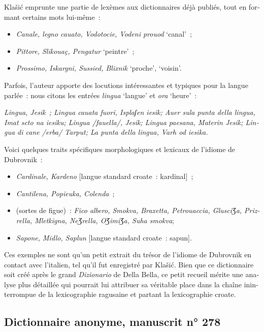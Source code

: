 \documentclass[output=paper,colorlinks,citecolor=brown,arabicfont,chinesefont,booklanguage=french]{langscibook}
\begin{document}
\begin{otherlanguage}{french}
Klašić emprunte une partie de lexèmes aux dictionnaires déjà publiés, tout en formant certains mots lui-même~:

\begin{itemize}
    \item \emph{Canale, legno cauato, Vodotocie, Vodeni prouod} ‘canal’~;
    \item \emph{Pittore, Slikouaç, Pengatur} ‘peintre’~; 
    \item \emph{Prossimo, Iskargni, Sussied, Blixnik} ‘proche’, ‘voisin’. 
\end{itemize}

Parfois, l’auteur apporte des locutions intéressantes et typiques pour la langue parlée~: nous citons les entrées \emph{lingua} ‘langue’ et \emph{ora} ‘heure’~: 

\emph{Lingua, Jesik~; Lingua cauata fuori, Isplaʃen iesik; Auer sula punta della lingua, Imat scto na iesiku; Lingua /fauella/, Jesik; Lingua paesana, Materin Jesik; Lingua di cane /erba/ Tarput; La punta della lingua, Varh od iesika.} 

Voici quelques traits spécifiques morphologiques et lexicaux de l’idiome de Dubrovnik~:

\begin{itemize}
    \item \emph{Cardinale, Kardeno} [langue standard croate~: kardinal]~; 
    \item \emph{Cantilena, Popieuka, Colenda}~; 
    \item (sortes de figue)~: \emph{Fico albero, Smokva, Braxetta, Petrouaccia, GlusciƷa, Prizrella, Mletkigna, NeƷrella, OƷimiƷa, Suha smokva}; 
    \item \emph{Sapone, Midlo, Saplun} [langue standard croate~: sapun]. 

\end{itemize}

Ces exemples ne sont qu’un petit extrait du trésor de l’idiome de Dubrovnik en contact avec l’italien, tel qu’il fut enregistré par Klašić. Bien que ce dictionnaire soit créé après le grand \emph{Dizionario} de Della Bella, ce petit recueil mérite une analyse plus détaillée qui pourrait lui attribuer sa véritable place dans la chaîne ininterrompue de la lexicographie ragusaine et partant la lexicographie croate. 

\subsection{Dictionnaire anonyme, manuscrit n° 278}


\end{otherlanguage}
\end{document}

